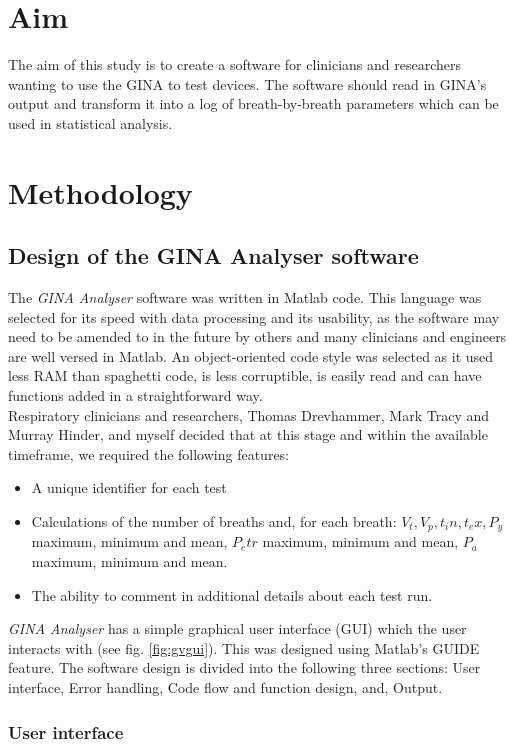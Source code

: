 \documentclass[12pt, openany, oneside]{book}
\begin{document}
\section{Aim}
The aim of this study is to create a software for clinicians and researchers wanting to use the GINA to test devices. The software should read in GINA's output and transform it into a log of breath-by-breath parameters which can be used in statistical analysis.
\section{Methodology}
\subsection{Design of the GINA Analyser software}
The \textit{GINA Analyser} software was written in Matlab code. This language was selected for its speed with data processing and its usability, as the software may need to be amended to in the future by others and many clinicians and engineers are well versed in Matlab. An object-oriented code style was selected as it used less RAM than spaghetti code, is less corruptible, is easily read and can have functions added in a straightforward way. \\

Respiratory clinicians and researchers, Thomas Drevhammer, Mark Tracy and Murray Hinder, and myself decided that at this stage and within the available timeframe, we required the following features:
\begin{itemize}
\item A unique identifier for each test
\item Calculations of the number of breaths and, for each breath: $V_t, V_p, t_in, t_ex, P_y$ maximum, minimum and mean, $P_etr$ maximum, minimum and mean, $P_a$ maximum, minimum and mean.
\item The ability to comment in additional details about each test run.
\end{itemize}

\textit{GINA Analyser} has a simple graphical user interface (GUI) which the user interacts with (see fig. \ref{fig:gvgui}). This was designed using Matlab's GUIDE feature. The software design is divided into the following three sections: User interface, Error handling,  Code flow and function design, and, Output.

\subsubsection{User interface}
\end{document}
